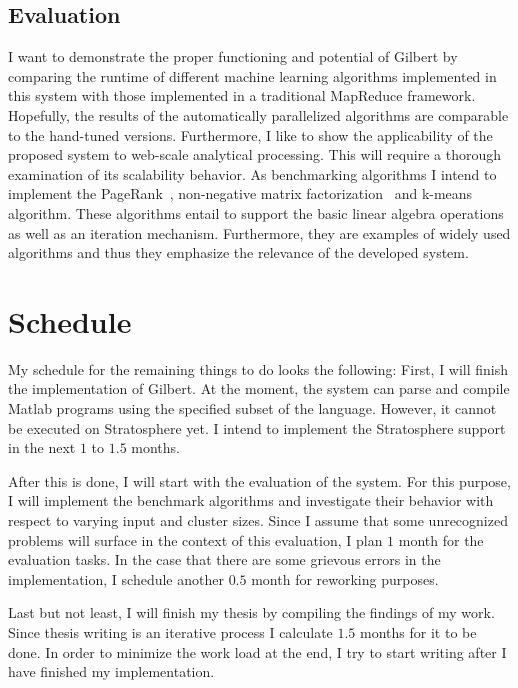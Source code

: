 \documentclass{dima}
\begin{document}
\subsection{Evaluation}

I want to demonstrate the proper functioning and potential of Gilbert by comparing the runtime of different machine learning algorithms implemented in this system with those implemented in a traditional MapReduce framework.
Hopefully, the results of the automatically parallelized algorithms are comparable to the hand-tuned versions.
Furthermore, I like to show the applicability of the proposed system to web-scale analytical processing.
This will require a thorough examination of its scalability behavior.
As benchmarking algorithms I intend to implement the PageRank~\cite{page:1999a}, non-negative matrix factorization~\cite{seung:anips2001a} and k-means~\cite{macqueen:1967a} algorithm.
These algorithms entail to support the basic linear algebra operations as well as an iteration mechanism.
Furthermore, they are examples of widely used algorithms and thus they emphasize the relevance of the developed system.

\section{Schedule}

My schedule for the remaining things to do looks the following:
First, I will finish the implementation of Gilbert.
At the moment, the system can parse and compile Matlab programs using the specified subset of the language.
However, it cannot be executed on Stratosphere yet.
I intend to implement the Stratosphere support in the next $1$ to $1.5$ months.

After this is done, I will start with the evaluation of the system.
For this purpose, I will implement the benchmark algorithms and investigate their behavior with respect to varying input and cluster sizes.
Since I assume that some unrecognized problems will surface in the context of this evaluation, I plan $1$ month for the evaluation tasks.
In the case that there are some grievous errors in the implementation, I schedule another $0.5$ month for reworking purposes.

Last but not least, I will finish my thesis by compiling the findings of my work.
Since thesis writing is an iterative process I calculate $1.5$ months for it to be done.
In order to minimize the work load at the end, I try to start writing after I have finished my implementation. 
\end{document}
